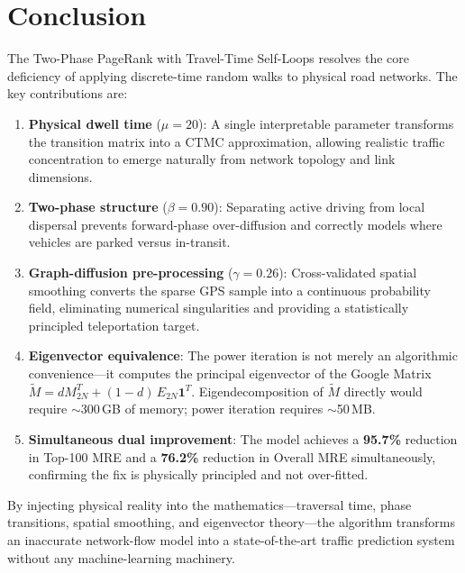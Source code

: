 \documentclass[12pt,a4paper]{article}
\theoremstyle{definition}
\theoremstyle{plain}
\begin{document}
\section{Conclusion}
\label{sec:conclusion}

The Two-Phase PageRank with Travel-Time Self-Loops resolves the core deficiency of
applying discrete-time random walks to physical road networks. The key contributions are:

\begin{enumerate}[label=\textbf{\arabic*.}]
  \item \textbf{Physical dwell time} ($\mu\!=\!20$): A single interpretable parameter
    transforms the transition matrix into a CTMC approximation, allowing realistic traffic
    concentration to emerge naturally from network topology and link dimensions.

  \item \textbf{Two-phase structure} ($\beta\!=\!0.90$): Separating active driving from
    local dispersal prevents forward-phase over-diffusion and correctly models where
    vehicles are parked versus in-transit.

  \item \textbf{Graph-diffusion pre-processing} ($\gamma\!=\!0.26$): Cross-validated
    spatial smoothing converts the sparse GPS sample into a continuous probability field,
    eliminating numerical singularities and providing a statistically principled
    teleportation target.

  \item \textbf{Eigenvector equivalence}: The power iteration is not merely an
    algorithmic convenience---it computes the principal eigenvector of the Google Matrix
    $\widetilde{M} = d M_{2N}^T + (1-d)\,E_{2N}\bm{1}^T$. Eigendecomposition of
    $\widetilde{M}$ directly would require $\sim$300\,GB of memory; power iteration
    requires $\sim$50\,MB.

  \item \textbf{Simultaneous dual improvement}: The model achieves a \textbf{95.7\%}
    reduction in Top-100 MRE and a \textbf{76.2\%} reduction in Overall MRE
    simultaneously, confirming the fix is physically principled and not over-fitted.
\end{enumerate}

\begin{result}
  By injecting physical reality into the mathematics---traversal time, phase transitions,
  spatial smoothing, and eigenvector theory---the algorithm transforms an inaccurate
  network-flow model into a state-of-the-art traffic prediction system without any
  machine-learning machinery.
\end{result}
\end{document}
